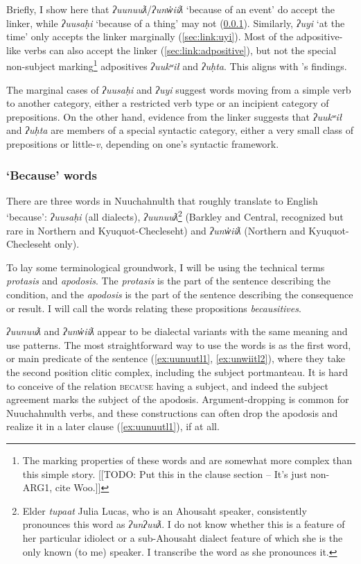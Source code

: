 Briefly, I show here that \textit{ʔuunuuƛ}/\textit{ʔunw̓iiƛ} `because of an event' do accept the linker, while \textit{ʔuusaḥi} `because of a thing' may not (\ref{sec:link:because}). Similarly, \textit{ʔuyi} `at the time' only accepts the linker marginally (\ref{sec:link:uyi}). Most of the adpositive-like verbs can also accept the linker (\ref{sec:link:adpositive}), but not the special non-subject marking\footnote{The marking properties of these words and are somewhat more complex than this simple story. [[TODO: Put this in the clause section -- It's just non-ARG1, cite Woo.]]} adpositives \textit{ʔuukʷił} and \textit{ʔuḥta}. This aligns with \citeauthor{woo2007b}'s findings.

The marginal cases of \textit{ʔuusaḥi} and \textit{ʔuyi} suggest words moving from a simple verb to another category, either a restricted verb type or an incipient category of prepositions. On the other hand, evidence from the linker suggests that \textit{ʔuukʷił} and \textit{ʔuḥta} are members of a special syntactic category, either a very small class of prepositions or little-\textit{v}, depending on one's syntactic framework.

\subsubsection{`Because' words} \label{sec:link:because}

There are three words in Nuuchahnulth that roughly translate to English `because': \textit{ʔuusaḥi} (all dialects), \textit{ʔuunuuƛ}\footnote{Elder \textit{tupaat} Julia Lucas, who is an Ahousaht speaker, consistently pronounces this word as \textit{ʔunʔuuƛ}. I do not know whether this is a feature of her particular idiolect or a sub-Ahousaht dialect feature of which she is the only known (to me) speaker. I transcribe the word as she pronounces it.} (Barkley and Central, recognized but rare in Northern and Kyuquot-Checleseht) and \textit{ʔunw̓iiƛ} (Northern and Kyuquot-Checleseht only).

To lay some terminological groundwork, I will be using the technical terms \textit{protasis} and \textit{apodosis}. The \textit{protasis} is the part of the sentence describing the condition, and the \textit{apodosis} is the part of the sentence describing the consequence or result. I will call the words relating these propositions \textit{becausitives}.

\textit{ʔuunuuƛ} and \textit{ʔunw̓iiƛ} appear to be dialectal variants with the same meaning and use patterns. The most straightforward way to use the words is as the first word, or main predicate of the sentence (\ref{ex:uunuutl1}, \ref{ex:unwiitl2}), where they take the second position clitic complex, including the subject portmanteau. It is hard to conceive of the relation \textsc{because} having a subject, and indeed the subject agreement marks the subject of the apodosis. Argument-dropping is common for Nuuchahnulth verbs, and these constructions can often drop the apodosis and realize it in a later clause (\ref{ex:uunuutl1}), if at all.

